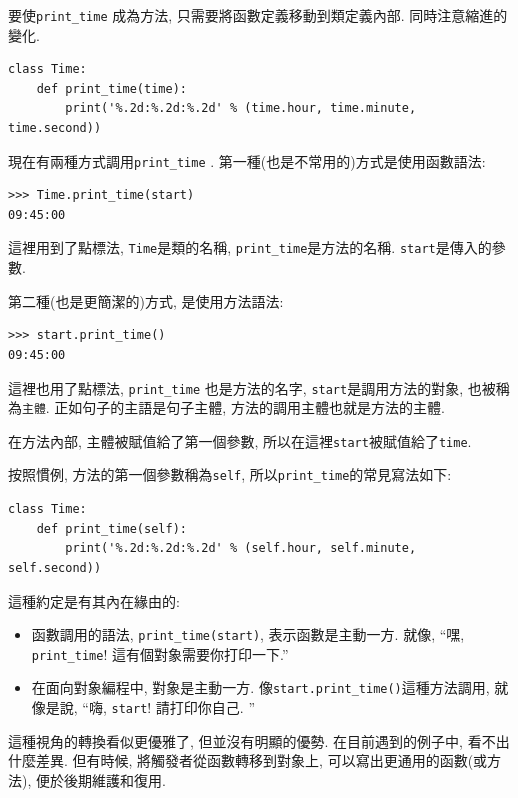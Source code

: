 \documentclass[10pt]{book}
\begin{document}
要使\verb"print_time" 成為方法, 只需要將函數定義移動到類定義內部. 
同時注意縮進的變化. 

\begin{verbatim}
class Time:
    def print_time(time):
        print('%.2d:%.2d:%.2d' % (time.hour, time.minute, time.second))
\end{verbatim}
%
現在有兩種方式調用\verb"print_time" . 
第一種(也是不常用的)方式是使用函數語法:

\begin{verbatim}
>>> Time.print_time(start)
09:45:00
\end{verbatim}
%
這裡用到了點標法, {\tt Time}是類的名稱, 
\verb"print_time"是方法的名稱. 
{\tt start}是傳入的參數. 

第二種(也是更簡潔的)方式, 是使用方法語法:

\begin{verbatim}
>>> start.print_time()
09:45:00
\end{verbatim}
%
這裡也用了點標法, \verb"print_time" 也是方法的名字, {\tt start}是調用方法的對象, 
也被稱為{\tt 主體}. 
正如句子的主語是句子主體, 方法的調用主體也就是方法的主體. 

在方法內部, 主體被賦值給了第一個參數, 所以在這裡{\tt start}被賦值給了{\tt time}.

按照慣例, 方法的第一個參數稱為{\tt self}, 所以\verb"print_time"的常見寫法如下:

\begin{verbatim}
class Time:
    def print_time(self):
        print('%.2d:%.2d:%.2d' % (self.hour, self.minute, self.second))
\end{verbatim}
%

這種約定是有其內在緣由的:

\begin{itemize}

\item 函數調用的語法, \verb"print_time(start)",  表示函數是主動一方. 
就像, ``嘿, \verb"print_time"!  這有個對象需要你打印一下.''

\item 在面向對象編程中, 對象是主動一方. 像\verb"start.print_time()"這種方法調用, 
就像是說, ``嗨, {\tt start}! 請打印你自己. ''

\end{itemize}

這種視角的轉換看似更優雅了, 但並沒有明顯的優勢. 
在目前遇到的例子中, 看不出什麼差異. 
但有時候, 將觸發者從函數轉移到對象上, 
可以寫出更通用的函數(或方法), 便於後期維護和復用. 
\end{document}

